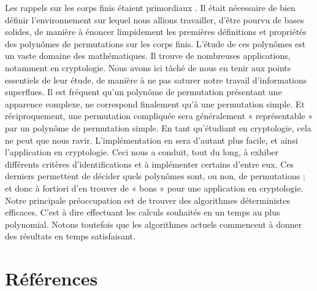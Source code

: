 \documentclass[12pt]{article}
\theoremstyle{definition}
\begin{document}
Les rappels sur les corps finis étaient primordiaux . Il était nécessaire de bien définir l'environnement sur lequel nous allions travailler, d’être pourvu de bases solides, de manière à énoncer limpidement les premières définitions et propriétés des polynômes de permutations sur les corps finis. L'étude de ces polynômes est un vaste domaine des mathématiques. Il trouve de nombreuses applications, notamment en cryptologie. Nous avons ici tâché de nous en tenir aux points essentiels de leur étude, de manière à ne pas saturer notre travail d’informations superflues. \newline
\break
Il est fréquent qu'un polynôme de permutation présentant une apparence complexe, ne correspond finalement qu’à une permutation simple. Et réciproquement, une permutation compliquée sera généralement « représentable » par un polynôme de permutation simple. En tant qu’étudiant en cryptologie, cela ne peut que nous ravir. L’implémentation en sera d’autant plus facile, et ainsi l’application en cryptologie. \newline
Ceci nous a conduit, tout du long, à exhiber différents critères d’identifications et à implémenter certains d’entre eux. Ces derniers permettent de décider quels polynômes sont, ou non, de permutations ; et donc à fortiori d'en trouver de « bons » pour une application en cryptologie. \newline
Notre principale préoccupation est de trouver des algorithmes déterministes efficaces.  C’est à dire effectuant les calculs souhaités en un temps au plus polynomial. Notons toutefois que les algorithmes actuels commencent à donner des résultats en temps satisfaisant.\\

\pagebreak


\section*{Références}
\end{document}
